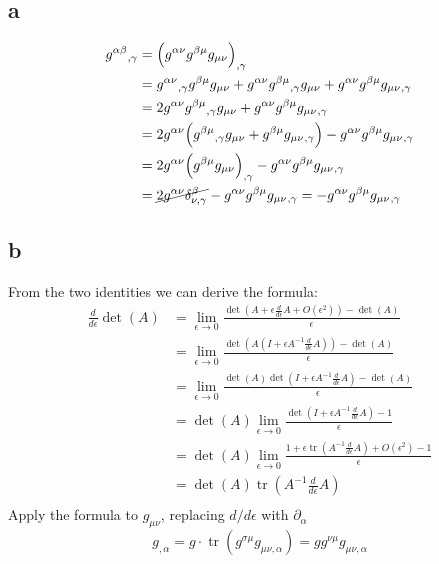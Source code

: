\documentclass{article}
\DeclareMathOperator{\tr}{tr}
\begin{document}
\subsection*{a}
\begin{align*}
g^{\alpha\beta}{}_{,\gamma} &=\Big( g^{\alpha\nu}g^{\beta\mu}g_{\mu\nu}\Big)_{,\gamma} \\
&= g^{\alpha\nu}{}_{,\gamma}g^{\beta\mu}g_{\mu\nu} + g^{\alpha\nu}g^{\beta\mu}{}_{,\gamma}g_{\mu\nu} + g^{\alpha\nu}g^{\beta\mu}g_{\mu\nu}{}_{,\gamma} \\
&= 2g^{\alpha\nu}g^{\beta\mu}{}_{,\gamma}g_{\mu\nu} + g^{\alpha\nu}g^{\beta\mu}g_{\mu\nu}{}_{,\gamma} \\
&= 2g^{\alpha\nu}\Big( g^{\beta\mu}{}_{,\gamma}g_{\mu\nu} + g^{\beta\mu}g_{\mu\nu}{}_{,\gamma}\Big) - g^{\alpha\nu}g^{\beta\mu}g_{\mu\nu}{}_{,\gamma} \\
&= 2g^{\alpha\nu}\Big(g^{\beta\mu}g_{\mu\nu}\Big)_{,\gamma} - g^{\alpha\nu}g^{\beta\mu}g_{\mu\nu}{}_{,\gamma} \\
&= \cancel{2g^{\alpha\nu}\delta^\beta_{\nu,\gamma}} - g^{\alpha\nu}g^{\beta\mu}g_{\mu\nu}{}_{,\gamma} 
= - g^{\alpha\nu}g^{\beta\mu}g_{\mu\nu}{}_{,\gamma} 
\end{align*}
\subsection*{b}
From the two identities we can derive the formula:
\begin{align*} \frac{d}{d\epsilon}\det(A) &=  \lim_{\epsilon \rightarrow 0} \frac{\det(A + \epsilon \frac{d}{d\epsilon}A + O(\epsilon^2)) - \det(A)}{\epsilon}\\
	&= \lim_{\epsilon \rightarrow 0} \frac{\det(A(I + \epsilon A^{-1}\frac{d}{d\epsilon}A)) - \det(A)}{\epsilon} \\
	&=  \lim_{\epsilon \rightarrow 0} \frac{\det(A)\det(I + \epsilon A^{-1}\frac{d}{d\epsilon}A) - \det(A)}{\epsilon} \\
	&=  \det(A) \lim_{\epsilon \rightarrow 0} \frac{\det(I + \epsilon A^{-1}\frac{d}{d\epsilon}A) - 1}{\epsilon} \\
	&=  \det(A) \lim_{\epsilon \rightarrow 0} \frac{1 + \epsilon \tr(A^{-1}\frac{d}{d\epsilon}A) + O(\epsilon^2) - 1}{\epsilon} \\
	&=  \det(A) \tr(A^{-1}\frac{d}{d\epsilon}A) \\
\end{align*}
Apply the formula to $g_{\mu\nu}$, replacing $d/d\epsilon$ with $\partial_\alpha$
\[ g_{,\alpha} = g \cdot \tr(g^{\sigma\mu}g_{\mu\nu,\alpha}) = g g^{\nu\mu}g_{\mu\nu,\alpha} \]
\end{document}
